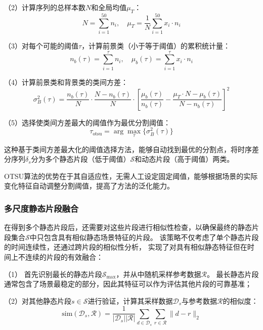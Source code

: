（2）计算序列的总样本数$N$和全局均值$\mu_T$：
\begin{equation}
N = \sum_{i=1}^{50} n_i, \quad \mu_T = \frac{1}{N}\sum_{i=1}^{50} x_i \cdot n_i
\end{equation}

（3）对每个可能的阈值$\tau$，计算前景类（小于等于阈值）的累积统计量：
\begin{equation}
n_b(\tau) = \sum_{i=1}^{\tau} n_i, \quad \mu_b(\tau) = \sum_{i=1}^{\tau} x_i \cdot n_i
\end{equation}

（4）计算前景类和背景类的类间方差：
\begin{equation}
\sigma_B^2(\tau) = \frac{n_b(\tau)}{N} \cdot \frac{N-n_b(\tau)}{N} \cdot [\frac{\mu_b(\tau)}{n_b(\tau)} - \frac{\mu_T \cdot N-\mu_b(\tau)}{N-n_b(\tau)}]^2
\end{equation}

（5）选择使类间方差最大的阈值作为最优分割阈值：
\begin{equation}
\tau_{\text{otsu}} = \arg\max_{\tau} \{\sigma_B^2(\tau)\}
\end{equation}

这种基于类间方差最大化的阈值选择方法，能够自动找到最优的分割点，将时序差分序列$\delta_s$分为多个静态片段（低于阈值）$\mathcal{S}$和动态片段（高于阈值）两类。

OTSU算法的优势在于其自适应性，无需人工设定固定阈值，能够根据场景的实际变化特征自动调整分割阈值，提高了方法的泛化能力。

\subsubsection{多尺度静态片段融合}
在得到多个静态片段后，还需要对这些片段进行相似性检查，以确保最终的静态片段集合$\mathcal{S}$中只包含具有相似静态场景特征的片段。
该策略不仅考虑了单个静态片段的时间连续性，还通过跨片段的相似性分析，
实现了对具有相似静态特征但在时间上不连续的片段的有效融合：

（1） 首先识别最长的静态片段$\mathcal{S}_{\text{max}}$，并从中随机采样参考数据$\mathcal{R}$。
   最长静态片段通常包含了场景最稳定的部分，因此其特征可以作为评估其他片段的可靠基准；

（2）对其他静态片段$s\in\mathcal{S}$进行验证，计算其采样数据$\mathcal{D}_s$与参考数据$\mathcal{R}$的相似度：
\begin{equation}
\text{sim}(\mathcal{D}_s, \mathcal{R}) = \frac{1}{|\mathcal{D}_s||\mathcal{R}|}\sum_{d \in \mathcal{D}_s}\sum_{r \in \mathcal{R}}\|d - r\|_2
\end{equation}


